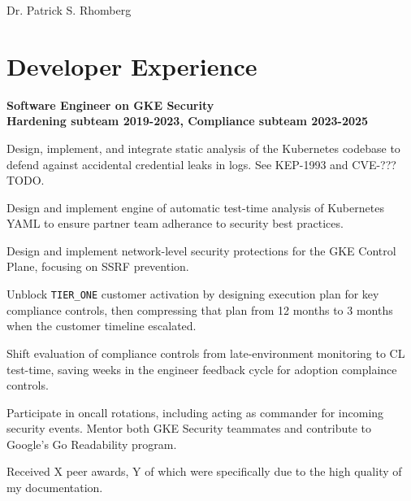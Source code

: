\documentclass[10pt,letterpaper]{article}
\def\name{Dr. Patrick S. Rhomberg}
\renewenvironment{itemize}{
  \begin{list}{}{
    \setlength{\leftmargin}{1.5em}
    \setlength{\itemsep}{0.25em}
    \setlength{\parskip}{0pt}
    \setlength{\parsep}{0.25em}
  }
}{
  \end{list}
}
\begin{document}
{\huge \name}
\bigskip



\newcommand{\thinNewLineWithQuad}{\par\vspace{-.2em}\quad}

\newcommand{\jobtitle}[1]{\textbf{#1}}
\newcommand{\timeAtJob}[1]{\hspace{\fill}{#1}}
\newcommand{\workplace}[1]{\thinNewLineWithQuad{#1}}


\section*{Developer Experience}
\begin{itemize}
\item
  \jobtitle{Software Engineer on GKE Security \\ Hardening subteam 2019-2023, Compliance subteam 2023-2025}
  \workplace{Google, LLC}
  \begin{itemize}
    \vspace{.5em}
  \item\quad Design, implement, and integrate static analysis of the Kubernetes codebase to defend against accidental credential leaks in logs.  See KEP-1993 and CVE-???TODO.
  \item\quad Design and implement engine of automatic test-time analysis of Kubernetes YAML to ensure partner team adherance to security best practices.
  \item\quad Design and implement network-level security protections for the GKE Control Plane, focusing on SSRF prevention.
  \item\quad Unblock \verb!TIER_ONE! customer activation by designing execution plan for key compliance controls, then compressing that plan from 12 months to 3 months when the customer timeline escalated.
  \item\quad Shift evaluation of compliance controls from late-environment monitoring to CL test-time, saving weeks in the engineer feedback cycle for adoption complaince controls.
  \item\quad Participate in oncall rotations, including acting as commander for incoming security events.  Mentor both GKE Security teammates and contribute to Google's Go Readability program.
  \item\quad Received X peer awards, Y of which were specifically due to the high quality of my documentation.
  \end{itemize}
  

\end{itemize}
\end{document}
